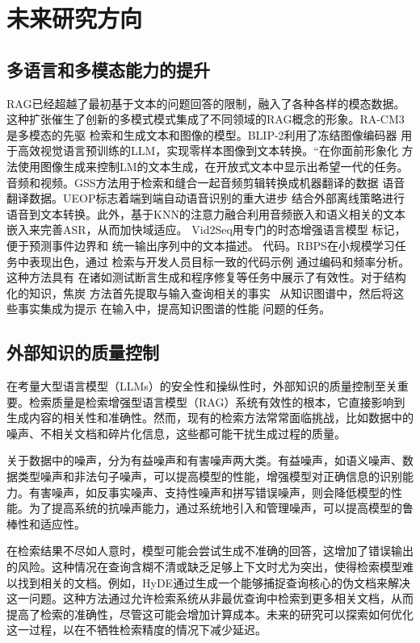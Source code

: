 \chapter{未来研究方向}

\section{多语言和多模态能力的提升}
RAG已经超越了最初基于文本的问题回答的限制，融入了各种各样的模态数据。
这种扩张催生了创新的多模式模式集成了不同领域的RAG概念的形象\cite{gao2024retrievalaugmentedgenerationlargelanguage}。RA-CM3\cite{yasunaga2023retrievalaugmentedmultimodallanguagemodeling}是多模态的先驱
检索和生成文本和图像的模型。BLIP-2\cite{li2023blip}利用了冻结图像编码器
用于高效视觉语言预训练的LLM，实现零样本图像到文本转换。“在你面前形象化
方法\cite{zhu2022visualize}使用图像生成来控制LM的文本生成，在开放式文本中显示出希望一代的任务。
音频和视频。GSS方法用于检索和缝合一起音频剪辑转换成机器翻译的数据
语音翻译数据\cite{zhao2022generating}。UEOP标志着端到端自动语音识别的重大进步
结合外部离线策略进行语音到文本转换\cite{chan2023using}。此外，基于KNN的注意力融合利用音频嵌入和语义相关的文本嵌入来完善ASR，从而加快域适应。
Vid2Seq用专门的时态增强语言模型
标记，便于预测事件边界和
统一输出序列中的文本描述\cite{yang2023vid2seq}。
代码。RBPS\cite{nashid2023retrieval}在小规模学习任务中表现出色，通过
检索与开发人员目标一致的代码示例
通过编码和频率分析。这种方法具有
在诸如测试断言生成和程序修复等任务中展示了有效性。对于结构化的知识，焦炭
方法\cite{li2023chain}首先提取与输入查询相关的事实
\
从知识图谱中，然后将这些事实集成为提示
在输入中，提高知识图谱的性能
问题的任务。
\section{外部知识的质量控制}

在考量大型语言模型（LLMs）的安全性和操纵性时，外部知识的质量控制至关重要。检索质量是检索增强型语言模型（RAG）系统有效性的根本，它直接影响到生成内容的相关性和准确性。然而，现有的检索方法常常面临挑战，比如数据中的噪声、不相关文档和碎片化信息，这些都可能干扰生成过程的质量。

关于数据中的噪声，分为有益噪声和有害噪声两大类。有益噪声，如语义噪声、数据类型噪声和非法句子噪声，可以提高模型的性能，增强模型对正确信息的识别能力。有害噪声，如反事实噪声、支持性噪声和拼写错误噪声，则会降低模型的性能。为了提高系统的抗噪声能力，通过系统地引入和管理噪声，可以提高模型的鲁棒性和适应性。

在检索结果不尽如人意时，模型可能会尝试生成不准确的回答，这增加了错误输出的风险。这种情况在查询含糊不清或缺乏足够上下文时尤为突出，使得检索模型难以找到相关的文档。例如，HyDE\cite{gao2022precisezeroshotdenseretrieval}通过生成一个能够捕捉查询核心的伪文档来解决这一问题。这种方法通过允许检索系统从非最优查询中检索到更多相关文档，从而提高了检索的准确性，尽管这可能会增加计算成本。未来的研究可以探索如何优化这一过程，以在不牺牲检索精度的情况下减少延迟。


